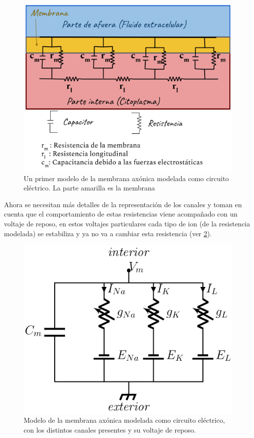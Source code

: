 \begin{figure}[h]
 \centering
 \includegraphics[scale=0.5]{../Figuras/ModeloHH.2}
 \caption{Un primer modelo de la membrana axónica modelada como circuito eléctrico. La parte amarilla es la membrana}
 \label{fig:ModelHh}
\end{figure}


Ahora se necesitan más detalles de la representación de los canales y toman en cuenta que el comportamiento de estas resistencias viene acompañado con un voltaje de reposo, en estos voltajes particulares cada tipo de ion (de la resistencia modelada) se estabiliza y ya no va a cambiar esta resistencia (ver \ref{fig:circuito}). 


\begin{figure}[h]
 \centering
 \includegraphics[scale=0.5]{../Figuras/circuito.png}
 \caption{Modelo de la membrana axónica modelada como circuito eléctrico, con los distintos canales presentes y su voltaje de reposo.}
 \label{fig:circuito}
\end{figure}

